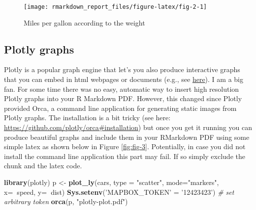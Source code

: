 \documentclass[
  12pt,
]{article}
\newenvironment{Shaded}{\begin{snugshade}}{\end{snugshade}}
\newcommand{\CommentTok}[1]{\textcolor[rgb]{0.56,0.35,0.01}{\textit{#1}}}
\newcommand{\DataTypeTok}[1]{\textcolor[rgb]{0.13,0.29,0.53}{#1}}
\newcommand{\KeywordTok}[1]{\textcolor[rgb]{0.13,0.29,0.53}{\textbf{#1}}}
\newcommand{\NormalTok}[1]{#1}
\newcommand{\OperatorTok}[1]{\textcolor[rgb]{0.81,0.36,0.00}{\textbf{#1}}}
\newcommand{\StringTok}[1]{\textcolor[rgb]{0.31,0.60,0.02}{#1}}
\begin{document}
\begin{figure}[H]

{\centering \texttt{[image: rmarkdown\_report\_files/figure-latex/fig-2-1]} 

}

\caption{Miles per gallon according to the weight}\label{fig:fig-2}
\end{figure}

\hypertarget{plotly-graphs}{%
\subsection{Plotly graphs}\label{plotly-graphs}}

Plotly is a popular graph engine that let's you also produce interactive graphs that you can embed in html webpages or documents (e.g., see \href{https://paulcbauer.shinyapps.io/visualizing-causal-scenarios/}{here}). I am a big fan. For some time there was no easy, automatic way to insert high resolution Plotly graphs into your R Markdown PDF. However, this changed since Plotly provided Orca, a command line application for generating static images from Plotly graphs. The installation is a bit tricky (see here: \url{https://github.com/plotly/orca\#installation}) but once you get it running you can produce beautiful graphs and include them in your RMarkdown PDF using some simple latex as shown below in Figure \ref{fig:fig-3}. Potentially, in case you did not install the command line application this part may fail. If so simply exclude the chunk and the latex code.

\begin{Shaded}
\begin{Highlighting}[]
\KeywordTok{library}\NormalTok{(plotly)}
\NormalTok{p <-}\StringTok{ }\KeywordTok{plot_ly}\NormalTok{(cars, }\DataTypeTok{type =} \StringTok{"scatter"}\NormalTok{, }\DataTypeTok{mode=}\StringTok{"markers"}\NormalTok{,}
        \DataTypeTok{x=}\OperatorTok{~}\NormalTok{speed,}
        \DataTypeTok{y=}\OperatorTok{~}\NormalTok{dist)}
\KeywordTok{Sys.setenv}\NormalTok{(}\StringTok{'MAPBOX_TOKEN'}\NormalTok{ =}\StringTok{ '12423423'}\NormalTok{) }\CommentTok{# set arbitrary token}
\KeywordTok{orca}\NormalTok{(p, }\StringTok{"plotly-plot.pdf"}\NormalTok{)}
\end{Highlighting}
\end{Shaded}
\end{document}

